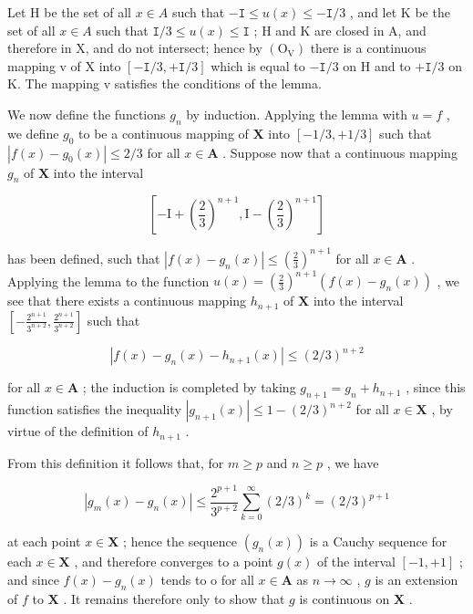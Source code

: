 Let H be the set of all \(x \in A\) such that \(-\mathtt{I} \leqslant u(x) \leqslant -\mathtt{I}/3\) , and let K be the set of all \(x \in A\) such that \(\mathtt{I}/3 \leqslant u(x) \leqslant \mathtt{I}\) ; H and K are closed in A, and therefore in X, and do not intersect; hence by \((\mathrm{O}_{\mathrm{V}})\) there is a continuous mapping v of X into \([-\mathtt{I}/3, +\mathtt{I}/3]\) which is equal to \(-\mathtt{I}/3\) on H and to \(+\mathtt{I}/3\) on K. The mapping v satisfies the conditions of the lemma.

We now define the functions \(g_n\) by induction. Applying the lemma with \(u = f\) , we define \(g_0\) to be a continuous mapping of \(\mathbf{X}\) into \([-1/3, +1/3]\) such that \(|f(x) - g_0(x)| \leqslant 2/3\) for all \(x \in \mathbf{A}\) . Suppose now that a continuous mapping \(g_n\) of \(\mathbf{X}\) into the interval

\[
[ - \mathrm{I} + (\frac {2}{3}) ^ {n + 1}, \mathrm{I} - (\frac {2}{3}) ^ {n + 1} ]
\]

has been defined, such that \(|f(x) - g_n(x)| \leqslant (\frac{2}{3})^{n+1}\) for all \(x \in \mathbf{A}\) . Applying the lemma to the function \(u(x) = (\frac{2}{3})^{n+1} (f(x) - g_n(x))\) , we see that there exists a continuous mapping \(h_{n+1}\) of \(\mathbf{X}\) into the interval \(\left[-\frac{2^{n+1}}{3^{n+2}}, \frac{2^{n+1}}{3^{n+2}}\right]\) such that

\[
\left| f (x) - g _ {n} (x) - h _ {n + 1} (x) \right| \leqslant (2 / 3) ^ {n + 2}
\]

for all \(x \in \mathbf{A}\) ; the induction is completed by taking \(g_{n+1} = g_n + h_{n+1}\) , since this function satisfies the inequality \(|g_{n+1}(x)| \leqslant 1 - (2/3)^{n+2}\) for all \(x \in \mathbf{X}\) , by virtue of the definition of \(h_{n+1}\) .

From this definition it follows that, for \(m \geqslant p\) and \(n \geqslant p\) , we have

\[
\left| g _ {m} (x) - g _ {n} (x) \right| \leqslant \frac {2 ^ {p + 1}}{3 ^ {p + 2}} \sum_ {k = 0} ^ {\infty} (2 / 3) ^ {k} = (2 / 3) ^ {p + 1}
\]

at each point \(x \in \mathbf{X}\) ; hence the sequence \((g_n(x))\) is a Cauchy sequence for each \(x \in \mathbf{X}\) , and therefore converges to a point \(g(x)\) of the interval \([-1, +1]\) ; and since \(f(x) - g_n(x)\) tends to o for all \(x \in \mathbf{A}\) as \(n \to \infty\) , \(g\) is an extension of \(f\) to \(\mathbf{X}\) . It remains therefore only to show that \(g\) is continuous on \(\mathbf{X}\) .

